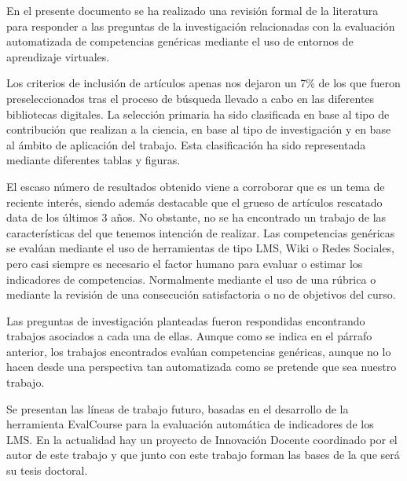 


En el presente documento se ha realizado una revisión formal de la literatura para responder a las preguntas de la investigación relacionadas con la evaluación automatizada de competencias genéricas mediante el uso de entornos de aprendizaje virtuales.

Los criterios de inclusión de artículos apenas nos dejaron un 7\% de los que fueron preseleccionados tras el proceso de búsqueda llevado a cabo en las diferentes bibliotecas digitales. La selección primaria ha sido clasificada en base al tipo de contribución que realizan a la ciencia, en base al tipo de investigación y en base al ámbito de aplicación del trabajo. Esta clasificación ha sido representada mediante diferentes tablas y figuras.

El escaso número de resultados obtenido viene a corroborar que es un tema de reciente interés, siendo además destacable que el grueso de artículos rescatado data de los últimos 3 años. No obstante, no se ha encontrado un trabajo de las características del que tenemos intención de realizar. Las competencias genéricas se evalúan mediante el uso de herramientas de tipo LMS, Wiki o Redes Sociales, pero casi siempre es necesario el factor humano para evaluar o estimar los indicadores de competencias. Normalmente mediante el uso de una rúbrica o mediante la revisión de una consecución satisfactoria o no de objetivos del curso.

Las preguntas de investigación planteadas fueron respondidas encontrando trabajos asociados a cada una de ellas. Aunque como se indica en el párrafo anterior, los trabajos encontrados evalúan competencias genéricas, aunque no lo hacen desde una perspectiva tan automatizada como se pretende que sea nuestro trabajo.

Se presentan las líneas de trabajo futuro, basadas en el desarrollo de la herramienta EvalCourse para la evaluación automática de indicadores de los LMS. En la actualidad hay un proyecto de Innovación Docente coordinado por el autor de este trabajo y que junto con este trabajo forman las bases de la que será su tesis doctoral.




